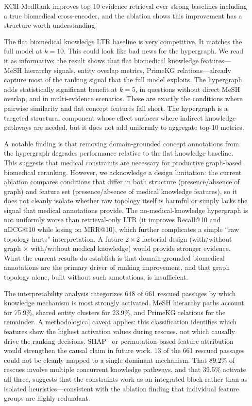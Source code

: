 KCH-MedRank improves top-10 evidence retrieval over strong baselines including a true biomedical cross-encoder, and the ablation shows this improvement has a structure worth understanding.

The flat biomedical knowledge LTR baseline is very competitive. It matches the full model at $k{=}10$. This could look like bad news for the hypergraph. We read it as informative: the result shows that flat biomedical knowledge features---MeSH hierarchy signals, entity overlap metrics, PrimeKG relations---already capture most of the ranking signal that the full model exploits. The hypergraph adds statistically significant benefit at $k{=}5$, in questions without direct MeSH overlap, and in multi-evidence scenarios. These are exactly the conditions where pairwise similarity and flat concept features fall short. The hypergraph is a targeted structural component whose effect surfaces where indirect knowledge pathways are needed, but it does not add uniformly to aggregate top-10 metrics.

A notable finding is that removing domain-grounded concept annotations from the hypergraph degrades performance relative to the flat knowledge baseline. This suggests that medical constraints are necessary for productive graph-based biomedical reranking. However, we acknowledge a design limitation: the current ablation compares conditions that differ in both structure (presence/absence of graph) and feature set (presence/absence of medical knowledge features), so it does not cleanly isolate whether raw topology itself is harmful or simply lacks the signal that medical annotations provide. The no-medical-knowledge hypergraph is not uniformly worse than retrieval-only LTR (it improves Recall@10 and nDCG@10 while losing on MRR@10), which further complicates a simple ``raw topology hurts'' interpretation. A future $2 \times 2$ factorial design (with/without graph $\times$ with/without medical knowledge) would provide stronger evidence. What the current results do establish is that domain-grounded biomedical annotations are the primary driver of ranking improvement, and that graph topology alone, built without such annotations, is insufficient.

The interpretability analysis categorizes 648 of 661 rescued passages by which knowledge mechanism is most strongly activated. MeSH hierarchy paths account for 75.9\%, shared entity clusters for 23.9\%, and PrimeKG relations for the remainder. A methodological caveat applies: this classification identifies which features show the highest activation values during rescues, not which causally drive the ranking decisions. SHAP~\citep{lundberg2017unified} or permutation-based feature attribution would strengthen the causal claim in future work. 13 of the 661 rescued passages could not be cleanly mapped to a single dominant mechanism. That 89.2\% of rescues involve multiple concurrent knowledge pathways, and that 39.5\% activate all three, suggests that the constraints work as an integrated block rather than as isolated heuristics---consistent with the ablation finding that individual feature groups are highly redundant.

